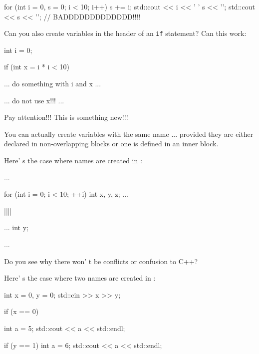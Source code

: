 \begin{console}
for (int i = 0, s = 0; i < 10; i++)
{   
    s += i;
    std::cout << i << ' ' s << '\n';
}
std::cout << s << '\n'; // BADDDDDDDDDDDDD!!!!
\end{console}

\begin{ex}Can you also create variables in the header of an \texttt{if} statement? Can this work:

\begin{console}
int i = 0;

if (int x = i * i < 10)
{   

    ... do something with i and x ...

}
     ... do not use x!!! ...
\end{console}
\end{ex}
\newpage{}

Pay attention!!! This is something new!!!

You can actually create variables with the same name ... provided they
are either declared in non-overlapping blocks or one is defined in an
inner block.

Here' s the case where names are created in :

\begin{consolethree}[escapeinside=||]
...

for (int i = 0; i < 10; ++i)
{   
     int x, y, z;
     ...
}

||||
{   
     ...
     int y;

}

... 
\end{consolethree}

Do you see why there won' t be conflicts or confusion to C++?

Here' s the case where two names are created in :

\begin{console}
int x = 0, y = 0;
std::cin >> x >> y;

if (x == 0)
{    
     int a = 5;
     std::cout << a << std::endl;

     if (y == 1)
     {
          int a = 6;
          std::cout << a << std::endl;
     }
}
\end{console}

